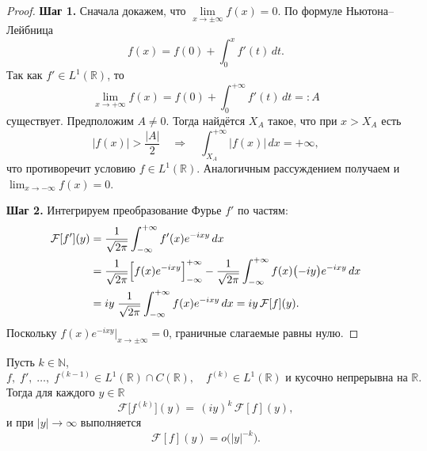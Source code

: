 \begin{proof}
    \textbf{Шаг 1.}
    Сначала докажем, что $\lim\limits_{x\to\pm\infty}f(x)=0$. По формуле Ньютона–Лейбница
    \[
        f(x)=f(0)+\int_{0}^{x}f'(t)\,dt.
    \]
    Так как $f'\in L^1(\mathbb R)$, то
    \[
        \lim_{x\to+\infty}f(x)
        =f(0)+\int_0^{+\infty}f'(t)\,dt =: A
    \]
    существует. Предположим $A\neq0$. Тогда найдётся $X_A$ такое, что при $x>X_A$ есть
    \[
        |f(x)|>\frac{|A|}{2}
        \quad\Longrightarrow\quad
        \int_{X_A}^{+\infty}|f(x)|\,dx = +\infty,
    \]
    что противоречит условию $f\in L^1(\mathbb R)$. Аналогичным рассуждением получаем и $\lim_{x\to-\infty}f(x)=0$.

    \medskip
    \noindent\textbf{Шаг 2.}
    Интегрируем преобразование Фурье $f'$ по частям:
    \begin{align*}
        \mathcal F[f'](y)
        &=\frac1{\sqrt{2\pi}}\int_{-\infty}^{+\infty}f'(x)e^{-i x y}\,dx\\
        &=\frac1{\sqrt{2\pi}}\Bigl[f(x)e^{-i x y}\Bigr]_{-\infty}^{+\infty}
        -\frac1{\sqrt{2\pi}}\int_{-\infty}^{+\infty}f(x)\bigl(-i y\bigr)e^{-i x y}\,dx\\
        &= i y\;\frac1{\sqrt{2\pi}}\int_{-\infty}^{+\infty}f(x)e^{-i x y}\,dx
        = i y\,\mathcal F[f](y).
    \end{align*}
    Поскольку $f(x)e^{-i x y}\Big|_{x\to\pm\infty}=0$, граничные слагаемые равны нулю.
\end{proof}
\begin{corollary}
    Пусть $k\in\mathbb{N}$,
    \[
        f,\;f',\;\dots,\;f^{(k-1)}\in L^1(\mathbb R)\cap C(\mathbb R),
        \quad
        f^{(k)}\in L^1(\mathbb R)\text{ и кусочно непрерывна на }\mathbb R.
    \]
    Тогда для каждого $y\in\mathbb R$
    \[
        \mathcal F\bigl[f^{(k)}\bigr](y)
        =\,(i y)^k\,\mathcal F[f](y),
    \]
    и при $|y|\to\infty$ выполняется
    \[
        \mathcal F[f](y)=o\bigl(|y|^{-k}\bigr).
    \]
\end{corollary}

